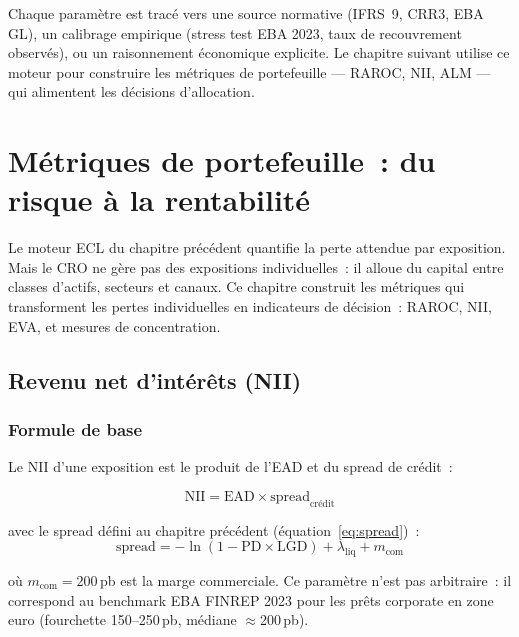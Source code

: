 \documentclass[12pt, a4paper, twoside, openright]{report}
\theoremstyle{definition}
\begin{document}
Chaque paramètre est tracé vers une source normative (IFRS~9, CRR3, EBA GL), un calibrage empirique (stress test EBA 2023, taux de recouvrement observés), ou un raisonnement économique explicite. Le chapitre suivant utilise ce moteur pour construire les métriques de portefeuille --- RAROC, NII, ALM --- qui alimentent les décisions d'allocation.


\chapter{Métriques de portefeuille~: du risque à la rentabilité}
\label{chap:metriques}

Le moteur ECL du chapitre précédent quantifie la perte attendue par exposition. Mais le CRO ne gère pas des expositions individuelles~: il alloue du capital entre classes d'actifs, secteurs et canaux. Ce chapitre construit les métriques qui transforment les pertes individuelles en indicateurs de décision~: RAROC, NII, EVA, et mesures de concentration.

\section{Revenu net d'intérêts (NII)}
\label{sec:metriques:nii}

\subsection{Formule de base}

Le NII d'une exposition est le produit de l'EAD et du spread de crédit~:

\begin{equation}
\text{NII} = \text{EAD} \times \text{spread}_{\text{crédit}}
\label{eq:nii}
\end{equation}

\noindent avec le spread défini au chapitre précédent (équation~\ref{eq:spread})~:
\begin{equation}
\text{spread} = -\ln(1 - \text{PD} \times \text{LGD}) + \lambda_{\text{liq}} + m_{\text{com}}
\label{eq:spread-nii}
\end{equation}

\noindent où $m_{\text{com}} = 200$\,pb est la marge commerciale. Ce paramètre n'est pas arbitraire~: il correspond au benchmark EBA FINREP 2023 pour les prêts corporate en zone euro (fourchette 150--250\,pb, médiane $\approx$200\,pb).
\end{document}
